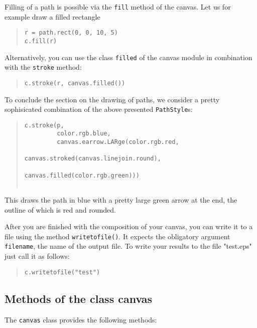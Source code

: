 Filling of a path is possible via the \verb|fill| method of the canvas.
Let us for example draw a filled rectangle 
\begin{quote}
\begin{verbatim}
r = path.rect(0, 0, 10, 5)
c.fill(r)
\end{verbatim}
\end{quote}
Alternatively, you can use the class \verb|filled| of the canvas module
in combination with the \verb|stroke| method:
\begin{quote}
\begin{verbatim}
c.stroke(r, canvas.filled())
\end{verbatim}
\end{quote}

To conclude the section on the drawing of paths, we consider a pretty
sophisicated combination of the above presented \verb|PathStyle|s:
\begin{quote}
\begin{verbatim}
c.stroke(p, 
         color.rgb.blue, 
         canvas.earrow.LARge(color.rgb.red,
                             canvas.stroked(canvas.linejoin.round),
                                            canvas.filled(color.rgb.green)))
                                                              
\end{verbatim}
\end{quote}
This draws the path in blue with a pretty large green arrow at the
end, the outline of which is red and rounded.

After you are finished with the composition of your canvas, you can
write it to a file using the method \verb|writetofile()|. It expects the
obligatory argument \verb|filename|, the name of the output
file. To write your results to the file "test.eps" just call it as follows:
\begin{quote}
\begin{verbatim}
c.writetofile("test")
\end{verbatim}
\end{quote}


\subsection{Methods of the class canvas}

The \verb|canvas| class provides the following methods:


